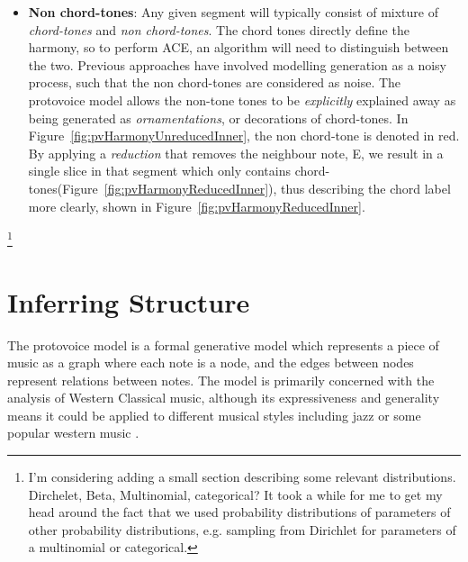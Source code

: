 \documentclass[12pt,a4paper,twoside,openright]{report}
\theoremstyle{definition}
\begin{document}
\begin{itemize}
  \item \textbf{Non chord-tones}: Any given segment will typically
    consist of mixture of \textit{chord-tones} and \textit{non chord-tones}.
    The chord tones directly define the harmony, so to perform ACE, an
    algorithm will need to distinguish between the two. Previous approaches
    have involved modelling generation as a noisy process, such that the non
    chord-tones are considered as
    noise\cite{temperleyAlgorithmHarmonicAnalysis1997}. The protovoice model
    allows the non-tone tones to be \textit{explicitly} explained away as being
    generated as \textit{ornamentations}, or decorations of chord-tones. 
    In Figure~\ref{fig:pvHarmonyUnreducedInner}, the non chord-tone is denoted in red. 
    By applying a \textit{reduction} that removes the neighbour note, E, we result in a single slice in that segment which only contains chord-tones(Figure~\ref{fig:pvHarmonyReducedInner}), thus describing the chord label more clearly, shown in Figure~\ref{fig:pvHarmonyReducedInner}.
\end{itemize}



%
%
%
%
%
%

\footnote{I'm considering adding a small section describing some relevant distributions. Dirchelet, Beta, Multinomial, categorical? It took a while for me to get my head around the fact that we used probability distributions of parameters of other probability distributions, e.g. sampling from Dirichlet for parameters of a multinomial or categorical.}

\section{Inferring Structure}


The protovoice model is a formal generative model which represents a piece of music as a graph where each note is a node, and the edges between nodes represent relations between notes. The model is primarily concerned with the analysis of Western Classical music, although its expressiveness and generality means it could be applied to different musical styles including jazz or some popular western music \cite{finkensiepStructureFreePolyphony2023}. 
\end{document}
